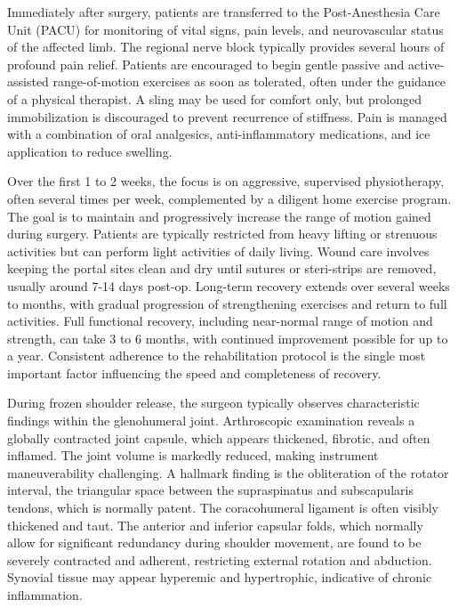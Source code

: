 Immediately after surgery, patients are transferred to the Post-Anesthesia Care Unit (PACU) for monitoring of vital signs, pain levels, and neurovascular status of the affected limb. The regional nerve block typically provides several hours of profound pain relief. Patients are encouraged to begin gentle passive and active-assisted range-of-motion exercises as soon as tolerated, often under the guidance of a physical therapist. A sling may be used for comfort only, but prolonged immobilization is discouraged to prevent recurrence of stiffness. Pain is managed with a combination of oral analgesics, anti-inflammatory medications, and ice application to reduce swelling.

Over the first 1 to 2 weeks, the focus is on aggressive, supervised physiotherapy, often several times per week, complemented by a diligent home exercise program. The goal is to maintain and progressively increase the range of motion gained during surgery. Patients are typically restricted from heavy lifting or strenuous activities but can perform light activities of daily living. Wound care involves keeping the portal sites clean and dry until sutures or steri-strips are removed, usually around 7-14 days post-op. Long-term recovery extends over several weeks to months, with gradual progression of strengthening exercises and return to full activities. Full functional recovery, including near-normal range of motion and strength, can take 3 to 6 months, with continued improvement possible for up to a year. Consistent adherence to the rehabilitation protocol is the single most important factor influencing the speed and completeness of recovery.

During frozen shoulder release, the surgeon typically observes characteristic findings within the glenohumeral joint. Arthroscopic examination reveals a globally contracted joint capsule, which appears thickened, fibrotic, and often inflamed. The joint volume is markedly reduced, making instrument maneuverability challenging. A hallmark finding is the obliteration of the rotator interval, the triangular space between the supraspinatus and subscapularis tendons, which is normally patent. The coracohumeral ligament is often visibly thickened and taut. The anterior and inferior capsular folds, which normally allow for significant redundancy during shoulder movement, are found to be severely contracted and adherent, restricting external rotation and abduction. Synovial tissue may appear hyperemic and hypertrophic, indicative of chronic inflammation.


